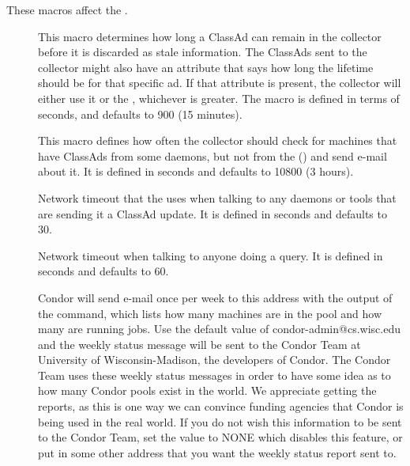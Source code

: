 These macros affect the .
\begin{description}
  
\item[] \label{param:ClassadLifetime} This
  macro determines how long a ClassAd can remain in the collector
  before it is discarded as stale information.  The ClassAds sent to
  the collector might also have an attribute that says how long the
  lifetime should be for that specific ad.  If that attribute is
  present, the collector will either use it or the
  , whichever is greater.  The macro is
  defined in terms of seconds, and defaults to 900 (15 minutes).
  
\item[]
  \label{param:MasterCheckInterval}  This macro defines how often the
  collector should check for machines that have ClassAds from some
  daemons, but not from the  ()
  and send e-mail about it.  It is defined in seconds and 
  defaults to 10800 (3 hours).

\item[] \label{param:ClientTimeout} Network
  timeout that the  uses when talking to any daemons
  or tools that are sending it a ClassAd update.
  It is defined in seconds and defaults to 30.
  
\item[] \label{param:QueryTimeout} Network
  timeout when talking to anyone doing a query. It is defined in seconds
  and defaults to 60.
  
\item[] \label{param:CondorDevelopers}
  Condor will send e-mail once per week to this address with the output
  of the  command, which lists how many machines
  are in the pool and how many are running jobs.  Use the default
  value of condor-admin@cs.wisc.edu and
  the weekly status message will be sent to the Condor Team at University of
  Wisconsin-Madison, the developers of Condor.  The Condor Team uses
  these weekly status messages in order to have some idea as to how
  many Condor pools exist in the world.  We appreciate
  getting the reports, as this is one way we can convince funding
  agencies that Condor is being used in the real world.  If you do
  not wish this information to be sent to the Condor Team,
  set the value to NONE which disables this feature, or put in some other
  address that you want the weekly status report sent to.


\end{description}
